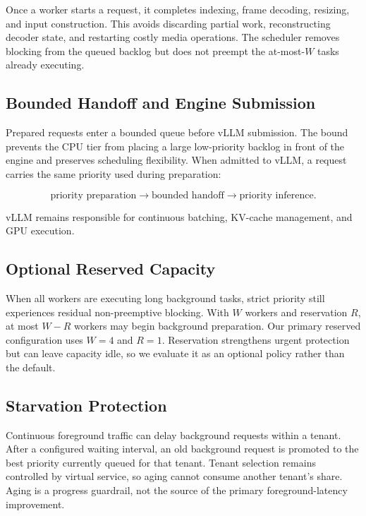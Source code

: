 \documentclass[sigconf,review,anonymous]{acmart}
\begin{document}
Once a worker starts a request, it completes indexing, frame decoding,
resizing, and input construction. This avoids discarding partial work,
reconstructing decoder state, and restarting costly media operations. The
scheduler removes blocking from the queued backlog but does not preempt the
at-most-$W$ tasks already executing.

\subsection{Bounded Handoff and Engine Submission}

Prepared requests enter a bounded queue before vLLM submission. The bound
prevents the CPU tier from placing a large low-priority backlog in front of
the engine and preserves scheduling flexibility. When admitted to vLLM, a
request carries the same priority used during preparation:

\begin{equation}
\text{priority preparation}
\rightarrow \text{bounded handoff}
\rightarrow \text{priority inference}.
\end{equation}

vLLM remains responsible for continuous batching, KV-cache management, and
GPU execution.

\subsection{Optional Reserved Capacity}

When all workers are executing long background tasks, strict priority still
experiences residual non-preemptive blocking. With $W$ workers and reservation
$R$, at most $W-R$ workers may begin background preparation. Our primary
reserved configuration uses $W=4$ and $R=1$. Reservation strengthens urgent
protection but can leave capacity idle, so we evaluate it as an optional
policy rather than the default.

\subsection{Starvation Protection}

Continuous foreground traffic can delay background requests within a tenant.
After a configured waiting interval, an old background request is promoted to
the best priority currently queued for that tenant. Tenant selection remains
controlled by virtual service, so aging cannot consume another tenant's
share. Aging is a progress guardrail, not the source of the primary
foreground-latency improvement.
\end{document}
